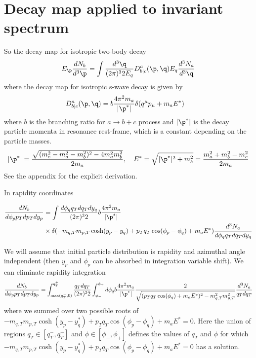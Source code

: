 \section{Decay map applied to invariant spectrum}

So the decay map for isotropic two-body decay
\begin{equation}
		E_{\p}\frac{dN_b}{d^3\p} =
	\int \frac{d^3 \q}{(2\pi)^3 2E_q}  D^a_{b|c}(\p,\q) E_{q}\frac{d^3N_a}{d^3 \q}
\end{equation}
where the decay map for isotropic s-wave decay is given by
\begin{align}
D^a_{b|c}(\p,\q)
&=b\frac{4\pi^2 m_a}{|\p^*|} \delta( q^\mu p_\mu+ m_a E^*)
\end{align}
 where $b$ is the branching ratio for $a\rightarrow b+c$ process
and $|\p^*|$ is the decay particle momenta in resonance rest-frame, which is a constant depending on the particle masses. 
\begin{equation}
|\p^*| = \frac{\sqrt{(m_c^2-m_a^2-m_b^2)^2-4 m_a^2 m_b^2}}{2m_a}, \quad E^{*} = \sqrt{|\p^*|^2+m_b^2}=\frac{m_a^2+m_b^2-m_c^2}{2m_a}
\end{equation}
See the appendix for the explicit derivation.

In rapidity coordinates

\begin{equation}
    \begin{split}
		\frac{dN_b}{d\phi_p p_T dp_T dy_p} & =
	\int \frac{d\phi_q q_T dq_T dy_q}{(2\pi)^3 2}  b\frac{4\pi^2 m_a}{|\p^*|}\\
    & \times\delta(-m_{q,T} m_{p,T}\cosh (y_p-y_q)+ p_T q_T \cos(\phi_p-\phi_q) + m_a E^*)\frac{d^3N_a}{d\phi_q q_T dq_T dy_q}
    \end{split}
\end{equation}

We will assume that initial particle distribution is rapidity and azimuthal angle independent (then $y_p$ and $\phi_p$ can be absorbed in integration variable shift). We can eliminate rapidity integration
\begin{equation}
		\frac{dN_b}{d\phi_p p_T dp_T dy_p} =
	\int_{\text{max}(q_T^-,0)}^{q_T^+} \frac{ q_T dq_T}{(2\pi)^3 2}  \int_{\phi_-}^{\phi_+} d \phi_q b\frac{4\pi^2 m_a}{|\p^*|} \frac{2}{\sqrt{(p_T q_T \cos(\phi_q) + m_a E^*)^2 -m^2_{q,T} m^2_{p,T}}}\frac{d^3N_a}{q_T dq_T}
\end{equation}
where we summed over two possible roots of $-m_{q,T} m_{p,T}\cosh (y_p-y^*_q)+ p_T q_T \cos(\phi_p-\phi_q) + m_a E^*=0$. Here the union of regions $q_T\in [q_T^-,q_T^+]$ and $\phi \in [\phi_-,\phi_+]$ defines the values of $q_T$ and $\phi$ for which $-m_{q,T} m_{p,T}\cosh (y_p-y^*_q)+ p_T q_T \cos(\phi_p-\phi_q) + m_a E^*=0$ has a solution.

